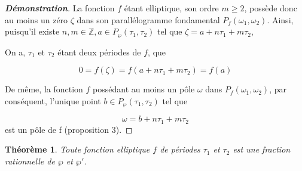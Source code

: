 \documentclass[12pt]{article}
\newtheorem{theorem}{Théorème}
\begin{document}
                    \begin{proof}[\textbf{Démonstration}] 
                    La fonction \(f\) étant elliptique, son ordre \(m \geq 2\), possède donc au moins un zéro \(\zeta\) dans son parallélogramme fondamental \(P_f(\omega_1, \omega_2)\). Ainsi, puisqu'il existe \(n, m \in \mathbb{Z}, a \in P_{\wp}(\tau_1, \tau_2)\) tel que \(\zeta = a + n\tau_1 + m\tau_2\),
                    
                    On a, \(\tau_1\) et \(\tau_2\) étant deux périodes de \(f\), que 
                    
                    \[
                    0 = f(\zeta) = f(a + n\tau_1 + m\tau_2) = f(a)
                    \]
                    
                    De même, la fonction \(f\) possédant au moins un pôle \(\omega\) dans \(P_f(\omega_1, \omega_2)\), par conséquent, l'unique point \(b \in P_{\wp}(\tau_1, \tau_2)\) tel que
                    
                    \[
                        \omega = b + n\tau_1 + m\tau_2
                    \]
                    est un pôle de f (proposition 3).
                \end{proof}
                \begin{theorem}
                    Toute fonction elliptique \(f\) de périodes \(\tau_1\) et \(\tau_2\) est une fraction rationnelle de \(\wp\) et \(\wp'\).
                    \end{theorem}
                    
\end{document}
